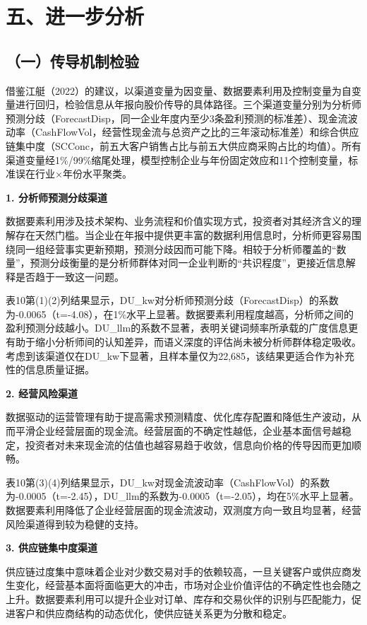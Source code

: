 \section{五、进一步分析}\label{ux4e94ux8fdbux4e00ux6b65ux5206ux6790}

\subsection{（一）传导机制检验}\label{ux4e00ux4f20ux5bfcux673aux5236ux68c0ux9a8c}

借鉴江艇（2022）的建议，以渠道变量为因变量、数据要素利用及控制变量为自变量进行回归，检验信息从年报向股价传导的具体路径。三个渠道变量分别为分析师预测分歧（ForecastDisp，同一企业年度内至少3条盈利预测的标准差）、现金流波动率（CashFlowVol，经营性现金流与总资产之比的三年滚动标准差）和综合供应链集中度（SCConc，前五大客户销售占比与前五大供应商采购占比的均值）。所有渠道变量经1\%/99\%缩尾处理，模型控制企业与年份固定效应和11个控制变量，标准误在行业×年份水平聚类。

\textbf{1. 分析师预测分歧渠道}

数据要素利用涉及技术架构、业务流程和价值实现方式，投资者对其经济含义的理解存在天然门槛。当企业在年报中提供更丰富的数据利用信息时，分析师更容易围绕同一组经营事实更新预期，预测分歧因而可能下降。相较于分析师覆盖的``数量''，预测分歧衡量的是分析师群体对同一企业判断的``共识程度''，更接近信息解释是否趋于一致这一问题。

表10第(1)(2)列结果显示，DU\_kw对分析师预测分歧（ForecastDisp）的系数为-0.0065（t=-4.08），在1\%水平上显著。数据要素利用程度越高，分析师之间的盈利预测分歧越小。DU\_llm的系数不显著，表明关键词频率所承载的广度信息更有助于缩小分析师间的认知差异，而语义深度的评估尚未被分析师群体稳定吸收。考虑到该渠道仅在DU\_kw下显著，且样本量仅为22,685，该结果更适合作为补充性的信息质量证据。

\textbf{2. 经营风险渠道}

数据驱动的运营管理有助于提高需求预测精度、优化库存配置和降低生产波动，从而平滑企业经营层面的现金流。经营层面的不确定性越低，企业基本面信号越稳定，投资者对未来现金流的估值也越容易趋于收敛，信息向价格的传导因而更加顺畅。

表10第(3)(4)列结果显示，DU\_kw对现金流波动率（CashFlowVol）的系数为-0.0005（t=-2.45），DU\_llm的系数为-0.0005（t=-2.05），均在5\%水平上显著。数据要素利用降低了企业经营层面的现金流波动，双测度方向一致且均显著，经营风险渠道得到较为稳健的支持。

\textbf{3. 供应链集中度渠道}

供应链过度集中意味着企业对少数交易对手的依赖较高，一旦关键客户或供应商发生变化，经营基本面将面临更大的冲击，市场对企业价值评估的不确定性也会随之上升。数据要素利用可以提升企业对订单、库存和交易伙伴的识别与匹配能力，促进客户和供应商结构的动态优化，使供应链关系更为分散和稳定。


